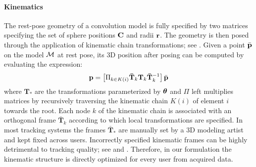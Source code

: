 \paragraph{Kinematics}
The rest-pose geometry of a convolution model is fully specified by two matrices specifying the set of sphere positions ${\mathbf{C}}$ and radii ${\mathbf{r}}$. The geometry is then posed through the application of  kinematic chain transformations; see . Given a point $\bar{\mathbf{p}}$ on the model $\mathcal{M}$ at rest pose, its 3D position after posing can be computed by evaluating the expression:
% 
\begin{equation}
\mathbf{p} = \left[ \Pi_{k \in K(i)} \mathbf{\bar{T}}_k \mathbf{T}_k \mathbf{\bar{T}}_k^{-1} \right] \bar{\mathbf{p}}
\label{eq:kinematic}
\end{equation}
%
where $\mathbf{T}_*$ are the transformations parameterized by $\boldsymbol{\theta}$ and $\Pi$ left multiplies matrices by recursively traversing the kinematic chain $K(i)$ of element $i$ towards the root. Each node $k$ of the kinematic chain is associated with an orthogonal frame $\mathbf{\bar{T}}_k$ according to which local transformations are specified. In most tracking systems the frames $\mathbf{\bar{T}}_*$ are manually set by a 3D modeling artist and kept fixed across users. Incorrectly specified kinematic frames can be highly detrimental to tracking quality; see  and . Therefore, in our formulation the kinematic structure is directly optimized for every user from acquired data.


